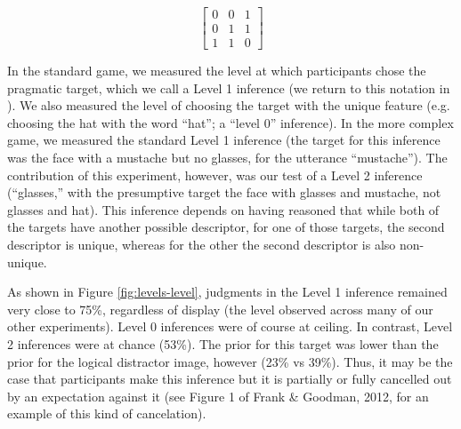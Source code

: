 \begin{equation}
\left[
    \begin{array}{ccc}
      0 & 0 & 1 \\
      0 & 1 & 1\\
      1 & 1 & 0 
    \end{array} 
  \right]
\end{equation}


In the standard game, we measured the level at which participants chose the pragmatic target, which we call a Level 1 inference (we return to this notation in ). We also measured the level of choosing the target with the unique feature (e.g. choosing the hat with the word ``hat''; a ``level 0'' inference). In the more complex game, we measured the standard Level 1 inference (the target for this inference was the face with a mustache but no glasses, for the utterance ``mustache''). The contribution of this experiment, however, was our test of a Level 2 inference (``glasses,'' with the presumptive target the face with glasses and mustache, not glasses and hat). This inference depends on having reasoned that while both of the targets have another possible descriptor, for one of those targets, the second descriptor is unique, whereas for the other the second descriptor is also non-unique. 

As shown in Figure \ref{fig:levels-level}, judgments in the Level 1 inference remained very close to 75\%, regardless of display (the level observed across many of our other experiments). Level 0 inferences were of course at ceiling. In contrast, Level 2 inferences were at chance (53\%). The prior for this target was lower than the prior for the logical distractor image, however (23\% vs 39\%). Thus, it may be the case that participants make this inference but it is partially or fully cancelled out by an expectation against it (see Figure 1 of Frank \& Goodman, 2012, for an example of this kind of cancelation). 

